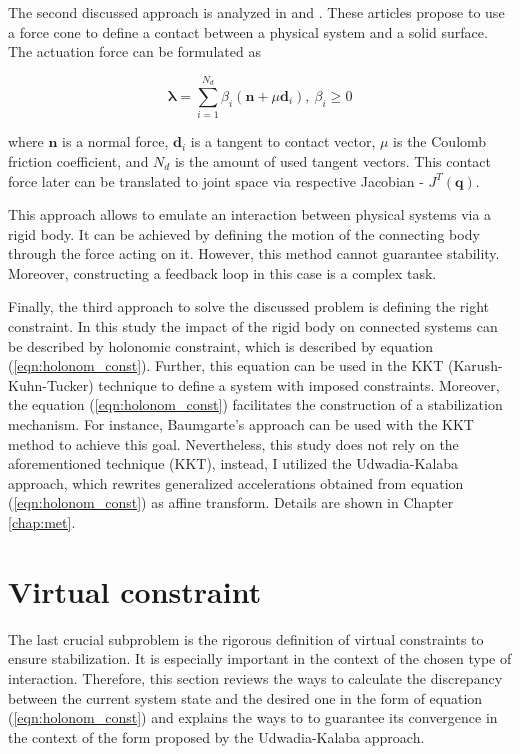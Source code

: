 The second discussed approach is analyzed in \cite{OptimizationBasedLocomotionPlanning}
and \cite{WholeBodyControlForm}. These articles propose to use a
force cone to define a contact between a physical system
and a solid surface. The actuation force can be formulated as


\begin{equation}
   \label{eqn:force_cone}
   \pmb{\lambda} = \sum_{i=1}^{N_d} \beta_i (\mathbf{n} + \mu \mathbf{d}_i),
   \: \beta_i \ge 0
\end{equation}


where $\mathbf{n}$ is a normal force, $\mathbf{d}_i$ is a tangent to contact
vector, $\mu$ is the Coulomb friction coefficient, and $N_d$ is the amount
of used tangent vectors. This contact force later can be translated to
joint space via respective Jacobian - $J^T(\mathbf{q})$.

This approach allows to emulate an interaction between
physical systems via a rigid body. It can be achieved by defining the motion
of the connecting body through the force acting on it. However, this method cannot
guarantee stability. Moreover, constructing a feedback loop in this case is
a complex task.

Finally, the third approach to solve the discussed problem is defining the right 
constraint. In this study the impact of the rigid body on connected systems can 
be described by holonomic constraint, which is described by equation 
(\ref{eqn:holonom_const}). Further, this equation can be used in the KKT 
(Karush-Kuhn-Tucker) technique to define a system with imposed constraints. 
Moreover, the equation (\ref{eqn:holonom_const}) facilitates the construction of a 
stabilization mechanism. For instance, Baumgarte's approach can be used 
with the KKT method to achieve this goal. Nevertheless, this study does not rely on 
the aforementioned technique (KKT), instead, I utilized the Udwadia-Kalaba approach, 
which rewrites generalized accelerations obtained from equation
(\ref{eqn:holonom_const}) as affine transform. Details are shown in
Chapter \ref{chap:met}.

\section{Virtual constraint} \label{sec:virtual_constraint}

The last crucial subproblem is the rigorous definition of virtual constraints to 
ensure stabilization. It is especially important in the context of the chosen type of
interaction. Therefore, this section reviews the ways to calculate the discrepancy
between the current system state and the desired one in the form of equation
(\ref{eqn:holonom_const}) and explains the ways to to guarantee its convergence in the
context of the form proposed by the Udwadia-Kalaba approach.

